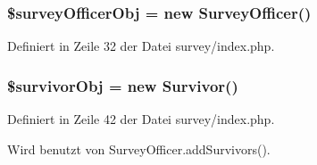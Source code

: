 \subsubsection{\setlength{\rightskip}{0pt plus 5cm}\$surveyOfficerObj = new {\bf SurveyOfficer}()}\label{survey_2index_8php_f02bcca2b2722955b3638c8e9d6f1914}




Definiert in Zeile 32 der Datei survey/index.php.
\subsubsection{\setlength{\rightskip}{0pt plus 5cm}\$survivorObj = new {\bf Survivor}()}\label{survey_2index_8php_f3b89f5b82e83dfe2408706cf2e48bb7}




Definiert in Zeile 42 der Datei survey/index.php.

Wird benutzt von SurveyOfficer.addSurvivors().